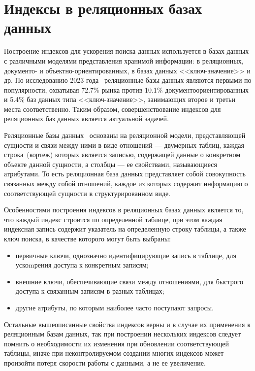 \section{Индексы в реляционных базах данных}

Построение индексов для ускорения поиска данных используется в базах данных с
различными моделями представления хранимой информации: в реляционных, документо-
и объектно-ориентированных, в базах данных <<ключ-значение>> и др. По
исследованию 2023 года~\cite{popularity} реляционные базы данных являются
первыми по популярности, охватывая 72.7\% рынка против 10.1\%
документоориентированных и 5.4\% баз данных типа <<ключ-значение>>, занимающих
второе и третьи места соответственно. Таким образом, совершенствование индексов
для реляционных баз данных является актуальной задачей.

Реляционные базы данных~\cite{halimon} основаны на реляционной модели,
представляющей сущности и связи между ними в виде отношений — двумерных таблиц,
каждая строка~(кортеж) которых является записью, содержащей данные о конкретном
объекте данной сущности, а столбцы — ее свойствами, называющиеся атрибутами. То
есть реляционная база данных представляет собой совокупность связанных между
собой отношений, каждое из которых содержит информацию о соответствующей
сущности в структурированном виде.

Особенностями построения индексов в реляционных базах данных является то, что
каждый индекс строится по определенной таблице, при этом каждая индексная запись
содержит  указатель на определенную строку таблицы, а также ключ поиска, в
качестве которого могут быть выбраны:

\begin{itemize}
    \item первичные ключи, однозначно идентифицирующие запись в таблице, для
    ускоmрения доступа к конкретным записям;
    \item внешние ключи, обеспечивающие связи между отношениями, для быстрого
    доступа к связанным записям в разных таблицах;
    \item другие атрибуты, по которым наиболее часто поступают запросы.
\end{itemize}

Остальные вышеописанные свойства индексов верны и в случае их применения к
реляционным базам данных, так при построении нескольких индексов следует помнить
о необходимости их изменения при обновлении соответствующей таблицы, иначе при
неконтролируемом создании многих индексов может произойти потеря скорости работы
с данными, а не ее увеличение.

